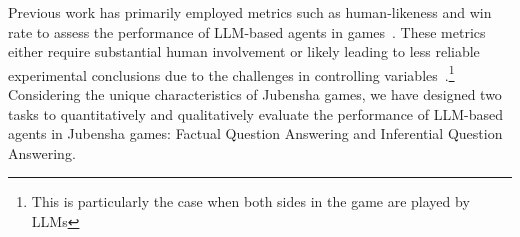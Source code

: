 \documentclass[11pt]{article}
\begin{document}
Previous work has primarily employed metrics such as human-likeness and win rate to assess the performance of LLM-based agents in games~\cite{wang2023survey,lai2023werewolf}. These metrics either require substantial human involvement or likely leading to less reliable experimental conclusions due to the challenges in controlling variables~\cite{lai2023werewolf}.\footnote{This is particularly the case when both sides in the game are played by LLMs} Considering the unique characteristics of Jubensha games, we have designed two tasks to quantitatively and qualitatively evaluate the performance of LLM-based agents in Jubensha games: Factual Question Answering and Inferential Question Answering.




\end{document}
